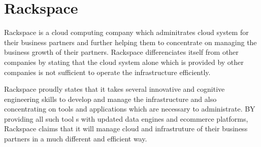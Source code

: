 \section{Rackspace}

Rackspace is a cloud computing company which adminitrates cloud system for their
business partners and further helping them to concentrate on managing the
business growth of their partners. Rackspace differenciates itself from other
companies by stating that the cloud system alone which is provided by other
companies is not sufficient to operate the infrastructure efficiently.

Rackspace proudly states that it takes several innovative and cognitive
engineering skills to develop and manage the infrastructure and also
concentrating on tools and applications which are necessary to administrate. BY
providing all such tool s with updated data engines and ecommerce platforms,
Rackspace claims that it will manage cloud and infrastruture of their business
partners in a much different and efficient way. \cite{Rackspace}



 